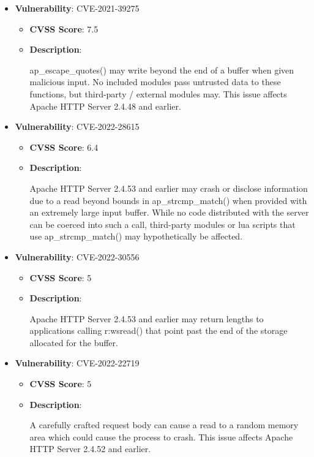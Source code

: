 \documentclass{article}
\begin{document}
\begin{itemize}
        \item \textbf{Vulnerability}: CVE-2021-39275
        \begin{itemize}
            \item \textbf{CVSS Score}:  7.5 
            \item \textbf{Description}:
            \parbox[t]{0.9\linewidth}{
                \ttfamily ap\_escape\_quotes() may write beyond the end of a buffer when given malicious input. No included modules pass untrusted data to these functions, but third-party / external modules may. This issue affects Apache HTTP Server 2.4.48 and earlier.
            }
        \end{itemize}
    
        \item \textbf{Vulnerability}: CVE-2022-28615
        \begin{itemize}
            \item \textbf{CVSS Score}:  6.4 
            \item \textbf{Description}:
            \parbox[t]{0.9\linewidth}{
                \ttfamily Apache HTTP Server 2.4.53 and earlier may crash or disclose information due to a read beyond bounds in ap\_strcmp\_match() when provided with an extremely large input buffer. While no code distributed with the server can be coerced into such a call, third-party modules or lua scripts that use ap\_strcmp\_match() may hypothetically be affected.
            }
        \end{itemize}
    
        \item \textbf{Vulnerability}: CVE-2022-30556
        \begin{itemize}
            \item \textbf{CVSS Score}:  5 
            \item \textbf{Description}:
            \parbox[t]{0.9\linewidth}{
                \ttfamily Apache HTTP Server 2.4.53 and earlier may return lengths to applications calling r:wsread() that point past the end of the storage allocated for the buffer.
            }
        \end{itemize}
    
        \item \textbf{Vulnerability}: CVE-2022-22719
        \begin{itemize}
            \item \textbf{CVSS Score}:  5 
            \item \textbf{Description}:
            \parbox[t]{0.9\linewidth}{
                \ttfamily A carefully crafted request body can cause a read to a random memory area which could cause the process to crash. This issue affects Apache HTTP Server 2.4.52 and earlier.
            }
        \end{itemize}
    

\end{itemize}
\end{document}
